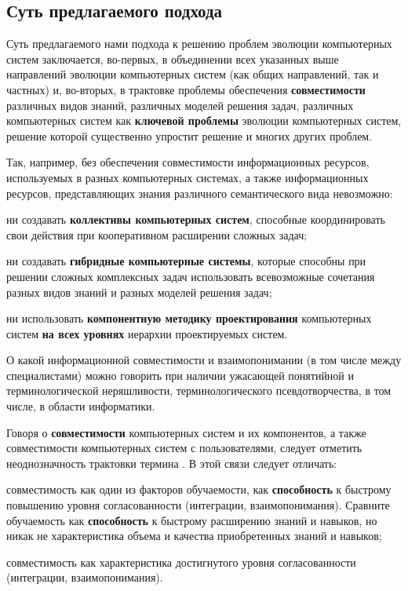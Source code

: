 \subsection{Суть предлагаемого подхода}
\label{subsec_essence_proposed_approach}
Суть предлагаемого нами подхода к решению проблем эволюции компьютерных систем заключается, во-первых, в объединении всех указанных выше направлений эволюции компьютерных систем (как общих направлений, так и частных) и, во-вторых, в трактовке проблемы обеспечения \textbf{совместимости} различных видов знаний, различных моделей решения задач, различных компьютерных систем как \textbf{ключевой проблемы} эволюции компьютерных систем, решение которой существенно упростит решение и многих других проблем.

Так, например, без обеспечения совместимости информационных ресурсов, используемых в разных компьютерных системах, а также информационных ресурсов, представляющих знания различного семантического вида невозможно:
\begin{textitemize}
	\item ни создавать \textbf{коллективы компьютерных систем}, способные координировать свои действия при кооперативном расширении сложных задач;
	\item ни создавать \textbf{гибридные компьютерные системы}, которые способны при решении сложных комплексных задач использовать всевозможные сочетания разных видов знаний и разных моделей решения задач;
	\item ни использовать \textbf{компонентную методику проектирования} компьютерных систем \textbf{на всех уровнях} иерархии проектируемых систем.
\end{textitemize}

О какой информационной совместимости и взаимопонимании (в том числе между специалистами) можно говорить при наличии ужасающей понятийной и терминологической неряшливости, терминологического псевдотворчества, в том числе, в области информатики.

Говоря о \textbf{совместимости} компьютерных систем и их компонентов, а также совместимости компьютерных систем с пользователями, следует отметить неоднозначность трактовки термина . В этой связи следует отличать:
\begin{textitemize}
    \item совместимость как один из факторов обучаемости, как \textbf{способность} к быстрому повышению уровня согласованности (интеграции, взаимопонимания).
    Сравните обучаемость как \textbf{способность} к быстрому расширению знаний и навыков, но никак не характеристика объема и качества приобретенных знаний и навыков;
    \item совместимость как характеристика достигнутого уровня согласованности (интеграции, взаимопонимания).
\end{textitemize}

